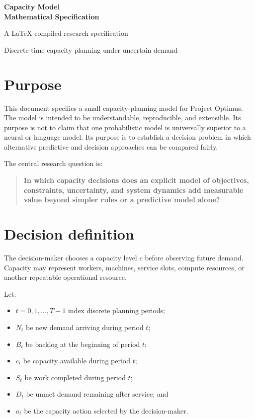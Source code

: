 \documentclass[11pt,a4paper]{article}
\begin{document}
\begin{titlepage}
  \centering
  \vspace*{35mm}
  {\Huge\bfseries\color{navy} Capacity Model\\[4mm] Mathematical Specification\par}
  \vspace{10mm}
  {\large\color{muted} A LaTeX-compiled research specification\par}
  \vspace{25mm}
  \vfill
  {\color{muted}Discrete-time capacity planning under uncertain demand\par}
\end{titlepage}

\section{Purpose}

This document specifies a small capacity-planning model for Project Optimus. The model is intended to be understandable, reproducible, and extensible. Its purpose is not to claim that one probabilistic model is universally superior to a neural or language model. Its purpose is to establish a decision problem in which alternative predictive and decision approaches can be compared fairly.

The central research question is:

\begin{quote}\textbf{In which capacity decisions does an explicit model of objectives, constraints, uncertainty, and system dynamics add measurable value beyond simpler rules or a predictive model alone?}\end{quote}

\section{Decision definition}

The decision-maker chooses a capacity level $c$ before observing future demand. Capacity may represent workers, machines, service slots, compute resources, or another repeatable operational resource.

Let:
\begin{itemize}
  \item $t = 0, 1, \ldots, T-1$ index discrete planning periods;
  \item $N_t$ be new demand arriving during period $t$;
  \item $B_t$ be backlog at the beginning of period $t$;
  \item $c_t$ be capacity available during period $t$;
  \item $S_t$ be work completed during period $t$;
  \item $D_t$ be unmet demand remaining after service; and
  \item $a_t$ be the capacity action selected by the decision-maker.
\end{itemize}
\end{document}
